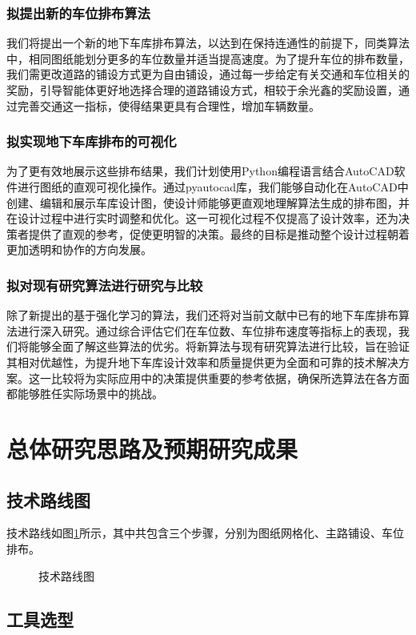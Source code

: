\subsubsection{拟提出新的车位排布算法}
我们将提出一个新的地下车库排布算法，以达到在保持连通性的前提下，同类算法中，相同图纸能划分更多的车位数量并适当提高速度。为了提升车位的排布数量，我们需更改道路的铺设方式更为自由铺设，通过每一步给定有关交通和车位相关的奖励，引导智能体更好地选择合理的道路铺设方式，相较于余光鑫\cite{1020332216.nh}的奖励设置，通过完善交通这一指标，使得结果更具有合理性，增加车辆数量。
\subsubsection{拟实现地下车库排布的可视化}
为了更有效地展示这些排布结果，我们计划使用Python编程语言结合AutoCAD软件进行图纸的直观可视化操作。通过pyautocad库，我们能够自动化在AutoCAD中创建、编辑和展示车库设计图，使设计师能够更直观地理解算法生成的排布图，并在设计过程中进行实时调整和优化。这一可视化过程不仅提高了设计效率，还为决策者提供了直观的参考，促使更明智的决策。最终的目标是推动整个设计过程朝着更加透明和协作的方向发展。
\subsubsection{拟对现有研究算法进行研究与比较}
除了新提出的基于强化学习的算法，我们还将对当前文献中已有的地下车库排布算法进行深入研究。通过综合评估它们在车位数、车位排布速度等指标上的表现，我们将能够全面了解这些算法的优劣。将新算法与现有研究算法进行比较，旨在验证其相对优越性，为提升地下车库设计效率和质量提供更为全面和可靠的技术解决方案。这一比较将为实际应用中的决策提供重要的参考依据，确保所选算法在各方面都能够胜任实际场景中的挑战。
\section{总体研究思路及预期研究成果}
\subsection{技术路线图}
技术路线如图\ref{fig:tec_road}所示，其中共包含三个步骤，分别为图纸网格化、主路铺设、车位排布。
\begin{figure}[H]
  \centering
  
  \caption{技术路线图}
  \label{fig:tec_road}
\end{figure}
\subsection{工具选型}
